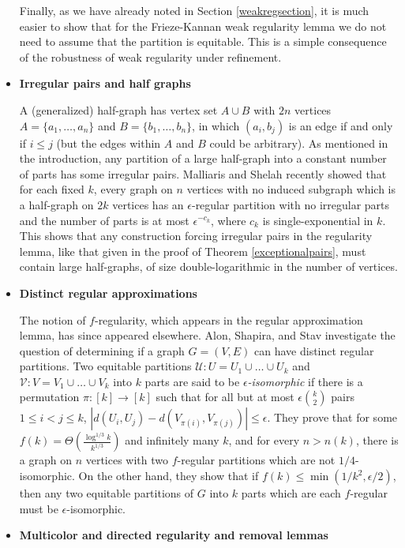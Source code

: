 \documentclass[11pt]{article}
\begin{document}
\begin{itemize}
Finally, as we have already noted in Section \ref{weakregsection}, it is much easier to show that for the Frieze-Kannan weak regularity lemma we do not need to assume that the partition is equitable. This is a simple consequence of the robustness of weak regularity under refinement.

\item {\bf Irregular pairs and half graphs}

A (generalized) half-graph has vertex set $A \cup B$ with $2n$ vertices
$A=\{a_1,\ldots,a_n\}$ and $B=\{b_1,\ldots,b_n\}$, in which $(a_i,b_j)$ is an
edge if and only if $i \leq j$ (but the edges within $A$ and $B$ could be
arbitrary). As mentioned in the introduction, any partition of a large
half-graph into a constant number of parts has some irregular pairs. Malliaris
and Shelah \cite{MSh} recently showed that for each fixed $k$, every graph on
$n$ vertices with no induced subgraph which is a half-graph on $2k$ vertices
has an $\epsilon$-regular partition with no irregular parts and the number of
parts is at most $\epsilon^{-c_k}$, where $c_k$ is single-exponential in $k$.
This shows that any construction forcing irregular pairs in the regularity
lemma, like that given in the proof of Theorem \ref{exceptionalpairs}, must
contain large half-graphs, of size double-logarithmic in the number of
vertices.

\item {\bf Distinct regular approximations}

The notion of $f$-regularity, which appears in the regular approximation lemma,
has since appeared elsewhere. Alon, Shapira, and Stav \cite{AlShSt} investigate
the question of determining if a graph $G=(V,E)$ can have distinct regular
partitions. Two equitable partitions $\mathcal{U}:U=U_1 \cup \ldots \cup U_k$
and $\mathcal{V}:V=V_1 \cup \ldots \cup V_k$ into $k$ parts are said to be {\it
$\epsilon$-isomorphic} if there is a permutation $\pi:[k] \rightarrow [k]$ such
that for all but at most $\epsilon{k \choose 2}$ pairs $1 \leq i<j \leq k$,
$|d(U_i,U_j)-d(V_{\pi(i)},V_{\pi(j)})| \leq \epsilon$. They prove that for some
$f(k)=\Theta\left(\frac{\log^{1/3} k}{k^{1/3}}\right)$ and infinitely many $k$,
and for every $n>n(k)$, there is a graph on $n$ vertices with two $f$-regular
partitions which are not $1/4$-isomorphic.
On the other hand,  they show that if $f(k) \leq \min(1/k^2,\epsilon/2)$, then
any two equitable partitions of $G$ into $k$ parts which  are each $f$-regular
must be $\epsilon$-isomorphic.

\item {\bf Multicolor and directed regularity and removal lemmas}


\end{itemize}
\end{document}
